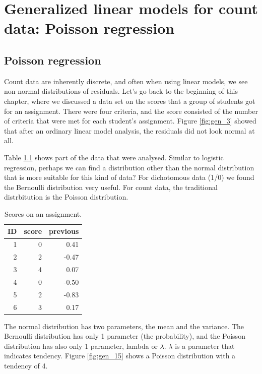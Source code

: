 \documentclass[]{report}\usepackage[]{graphicx}\usepackage[]{color}
\begin{document}
%




\chapter{Generalized linear models for count data: Poisson regression}


\section{Poisson regression}


Count data are inherently discrete, and often when using linear models, we see non-normal distributions of residuals. Let's go back to the beginning of this chapter, where we discussed a data set on the scores that a group of students got for an assignment. There were four criteria, and the score consisted of the number of criteria that were met for each student's assignment. Figure \ref{fig:gen_3} showed that after an ordinary linear model analysis, the residuals did not look normal at all.

Table \ref{tab:gen_14} shows part of the data that were analysed. Similar to logistic regression, perhaps we can find a distribution other than the normal distribution that is more suitable for this kind of data? For dichotomous data (1/0) we found the Bernoulli distribution very useful. For count data, the traditional distrbitution is the Poisson distribution.


\begin{table}[ht]
\centering
\caption{Scores on an assignment.} 
\label{tab:gen_14}
\begin{tabular}{rrr}
  \hline
ID & score & previous \\ 
  \hline
1 & 0 & 0.41 \\ 
  2 & 2 & -0.47 \\ 
  3 & 4 & 0.07 \\ 
  4 & 0 & -0.50 \\ 
  5 & 2 & -0.83 \\ 
  6 & 3 & 0.17 \\ 
   \hline
\end{tabular}
\end{table}


The normal distribution has two parameters, the mean and the variance. The Bernoulli distribution has only 1 parameter (the probability), and the Poisson distribution has also only 1 parameter, lambda or $\lambda$. $\lambda$ is a parameter that indicates tendency. Figure \ref{fig:gen_15} shows a Poisson distribution with a tendency of 4.
\end{document}
